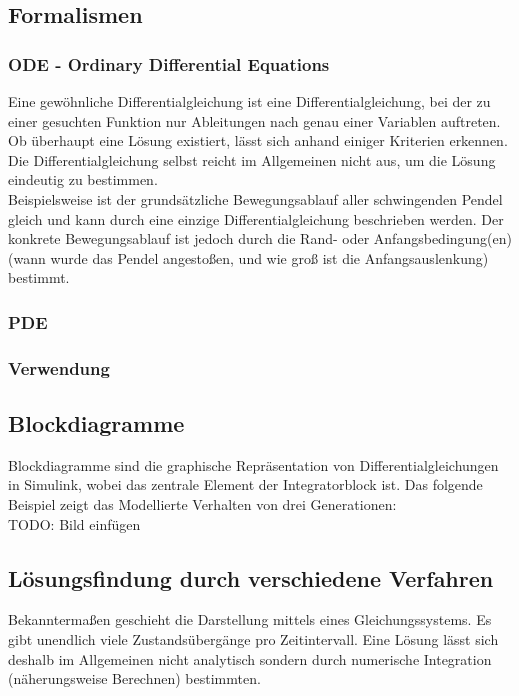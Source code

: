 \documentclass[11pt, fleqn, a4paper, leqno]{scrartcl} %
\begin{document}
	\subsection{Formalismen}
		\subsubsection{ODE - Ordinary Differential Equations}
		Eine gewöhnliche Differentialgleichung ist eine Differentialgleichung, bei der zu einer gesuchten Funktion nur Ableitungen nach genau einer Variablen auftreten. Ob überhaupt eine Lösung existiert, lässt sich anhand einiger Kriterien erkennen. Die Differentialgleichung selbst reicht im Allgemeinen nicht aus, um die Lösung eindeutig zu bestimmen.\\
	Beispielsweise ist der grundsätzliche Bewegungsablauf aller schwingenden Pendel gleich und kann durch eine einzige Differentialgleichung beschrieben werden. Der konkrete Bewegungsablauf ist jedoch durch die Rand- oder Anfangsbedingung(en) (wann wurde das Pendel angestoßen, und wie groß ist die Anfangsauslenkung) bestimmt.\\
		\subsubsection{PDE}
		
		\subsubsection{Verwendung}

	\subsection{Blockdiagramme}
		Blockdiagramme sind die graphische Repräsentation von Differentialgleichungen in Simulink, wobei das zentrale Element der Integratorblock ist. Das folgende Beispiel zeigt das Modellierte Verhalten von drei Generationen:\\
		TODO: Bild einfügen
		
	\subsection{Lösungsfindung durch verschiedene Verfahren}
		Bekanntermaßen geschieht die Darstellung mittels eines Gleichungssystems. Es gibt unendlich viele Zustandsübergänge pro Zeitintervall. Eine Lösung lässt sich deshalb im Allgemeinen nicht analytisch sondern durch numerische Integration (näherungsweise Berechnen) bestimmten.
\end{document}
